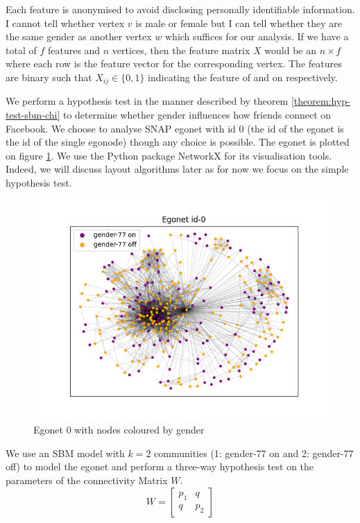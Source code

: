 \documentclass[]{article}
\newcommand{\figwidth}{0.55\linewidth}
\begin{document}
Each feature is anonymised to avoid disclosing personally identifiable information. I cannot tell whether vertex $v$ is male or female but I can tell whether they are the same gender as another vertex $w$ which suffices for our analysis. If we have a total of $f$ features and $n$ vertices, then the feature matrix $X$ would be an $n \times f$ where each row is the feature vector for the corresponding vertex. The features are binary such that $X_{ij} \in \{0, 1\}$ indicating the feature of and on respectively.

We perform a hypothesis test in the manner described by theorem \ref{theorem:hyp-test-sbm-chi} to determine whether gender influences how friends connect on Facebook. We choose to analyse SNAP egonet with id 0 (the id of the egonet is the id of the single egonode) though any choice is possible. The egonet is plotted on figure \ref{fig:ego-0-by-gender}. We use the Python package NetworkX \cite{networkx} for its visualisation tools. Indeed, we will discuss layout algorithms later as for now we focus on the simple hypothesis test.
%
\begin{figure}[!h]
	\centering
	\includegraphics[width=\figwidth]{ego-0-by-gender.png}
	\caption{Egonet 0 with nodes coloured by gender}
	\label{fig:ego-0-by-gender}
\end{figure}

We use an SBM model with $k=2$ communities (1: gender-77 on and 2: gender-77 off) to model the egonet and perform a three-way hypothesis test on the parameters of the connectivity Matrix $W$.
%
\begin{equation}
	W = \begin{bmatrix}
		p_1 & q \\
		q & p_2
	\end{bmatrix}
\end{equation}
\end{document}
